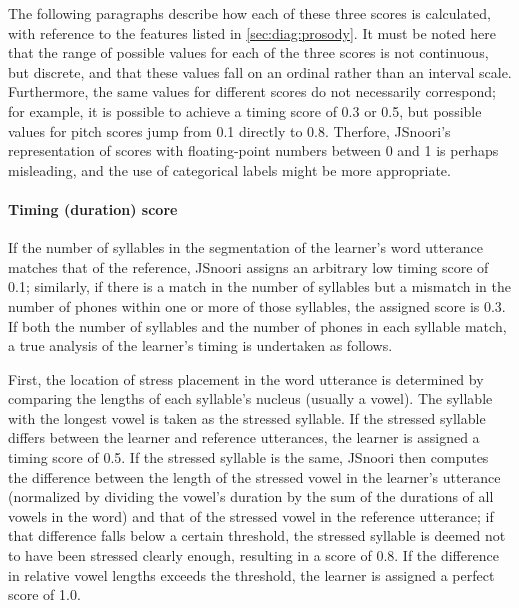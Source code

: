 	The following paragraphs describe how each of these three scores is calculated, with reference to the features listed in \cref{sec:diag:prosody}. It must be noted here that the range of possible values for each of the three scores is not continuous, but discrete, and that these values fall on an ordinal rather than an interval scale. Furthermore, the same values for different scores do not necessarily correspond; for example, it is possible to achieve a timing score of 0.3 or 0.5, but possible values for pitch scores jump from 0.1 directly to 0.8.
	Therfore, JSnoori's representation of scores with floating-point numbers between 0 and 1 is perhaps misleading, and the use of categorical labels might be more appropriate.
	
	
	
	\paragraph{Timing (duration) score}
	
	If the number of syllables in the segmentation of the learner's word utterance matches that of the reference, JSnoori assigns an arbitrary low timing score of 0.1; similarly, if there is a match in the number of syllables but a mismatch in the number of phones within one or more of those syllables, the assigned score is 0.3. 
	If both the number of syllables and the number of phones in each syllable match, a true analysis of the learner's timing is undertaken as follows.
	
	First, the location of stress placement in the word utterance is determined by comparing the lengths of each syllable's nucleus (usually a vowel).
	The syllable with the longest vowel is taken as the stressed syllable. If the stressed syllable differs between the learner and reference utterances, the learner is assigned a timing score of 0.5. If the stressed syllable is the same, JSnoori then computes the difference between the length of the stressed vowel in the learner's utterance (normalized by dividing the vowel's duration by the sum of the durations of all vowels in the word) and that of the stressed vowel in the reference utterance; if that difference falls below a certain threshold,
	the stressed syllable is deemed not to have been stressed clearly enough, resulting in a score of 0.8. If the difference in relative vowel lengths exceeds the threshold, the learner is assigned a perfect score of 1.0.
	
